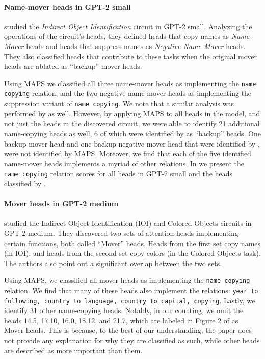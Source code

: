 \documentclass[11pt]{article}
\newcommand{\GPTsmall}{GPT-2 small}
\newcommand{\GPTmedium}{GPT-2 medium}
\newcommand{\framework}{\textsc{MAPS}}
\begin{document}
\paragraph{Name-mover heads in \GPTsmall{}}
\citet{wang2022interpretability} studied the \emph{Indirect Object Identification} circuit in \GPTsmall{}. Analyzing the operations of the circuit's heads, they defined heads that copy names as \emph{Name-Mover} heads and heads that suppress names as \emph{Negative Name-Mover} heads. They also classified heads that contribute to these tasks when the original mover heads are ablated as ``backup'' mover heads. 

Using \framework{} we classified all three name-mover heads as implementing the \texttt{name copying} relation, and the two negative name-mover heads as implementing the suppression variant of \texttt{name copying}. We note that a similar analysis was performed by \citet{wang2022interpretability} as well. However, by applying \framework{} to all heads in the model, and not just the heads in the discovered circuit, we were able to identify 21 additional name-copying heads as well, 6 of which were identified by \citet{wang2022interpretability} as ``backup'' heads. 
One backup mover head and one backup negative mover head that were identified by \citet{wang2022interpretability}, were not identified by \framework{}. Moreover, we find that each of the five identified name-mover heads implements a myriad of other relations.
In  we present the \texttt{name copying} relation scores for all heads in \GPTsmall{} and the heads classified by \citet{wang2022interpretability}.

\paragraph{Mover heads in \GPTmedium{}}
\citet{merullo2024circuit} studied the Indirect Object Identification (IOI) and Colored Objects circuits in \GPTmedium{}. They discovered two sets of attention heads implementing certain functions, both called ``Mover'' heads. Heads from the first set copy names (in IOI), and heads from the second set copy colors (in the Colored Objects task). The authors also point out a significant overlap between the two sets. 

Using \framework{}, we classified all mover heads as implementing the \texttt{name copying} relation. We find that many of these heads also implement the relations: \texttt{year to following, country to language, country to capital, copying}. Lastly, we identify 31 other name-copying heads. Notably, in our counting, we omit the heads 14.5, 17.10, 16.0, 18.12, and 21.7, which are labeled in Figure 2 of \citet{merullo2024circuit} as Mover-heads. This is because, to the best of our understanding, the paper does not provide any explanation for why they are classified as such, while other heads are described as more important than them.
\end{document}
